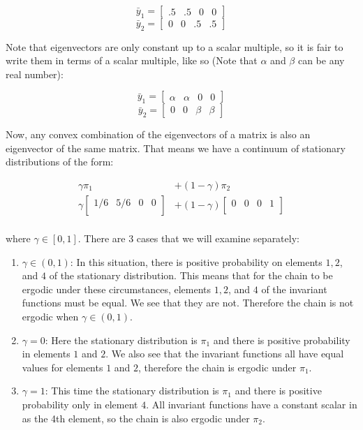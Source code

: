 \documentclass{homework}
\begin{document}
\begin{homeworkProblem}[Problem 2.14]
{\begin{enumerate}[a.]
        $$\bar{y}_1 = \begin{bmatrix} .5 & .5 & 0 & 0\end{bmatrix}$$
        $$ \bar{y}_2 =\begin{bmatrix} 0 & 0 & .5 & .5\end{bmatrix}$$

        Note that eigenvectors are only constant up to a scalar multiple, so it is fair to write them in terms of a scalar multiple, like so (Note that $\alpha$ and $\beta$ can be any real number):

        $$\bar{y}_1 = \begin{bmatrix} \alpha & \alpha & 0 & 0\end{bmatrix}$$
        $$ \bar{y}_2 =\begin{bmatrix} 0 & 0 & \beta & \beta\end{bmatrix}$$

        Now, any convex combination of the eigenvectors of a matrix is also an eigenvector of the same matrix. That means we have a continuum of stationary distributions of the form:

        \begin{align*}
           \gamma \pi_1 &+ (1 - \gamma) \pi_2 \\
           \gamma  \begin{bmatrix} 1/6 & 5/6 & 0 & 0\\ \end{bmatrix} &+ (1 - \gamma) \begin{bmatrix} 0 & 0 & 0 & 1\\ \end{bmatrix} \\
        \end{align*}

        where $\gamma \in [0, 1]$. There are 3 cases that we will examine separately:

        \begin{enumerate}[1.]
          \item $\gamma \in (0, 1)$: In this situation, there is positive probability on elements $1, 2$, and $4$ of the stationary distribution. This means that for the chain to be ergodic under these circumstances, elements $1, 2$, and $4$ of the invariant functions must be equal. We see that they are not. Therefore the chain is not ergodic when $\gamma \in (0, 1)$.
          \item $\gamma = 0$: Here the stationary distribution is $\pi_1$ and there is positive probability in elements $1$ and $2$. We also see that the invariant functions all have equal values for elements $1$ and $2$, therefore the chain is ergodic under $\pi_1$.
          \item $\gamma = 1$: This time the stationary distribution is $\pi_1$ and there is positive probability only in element $4$. All invariant functions have a constant scalar in as the 4th element, so the chain is also ergodic under $\pi_2$.
        \end{enumerate}


\end{enumerate}}
\end{homeworkProblem}
\end{document}
